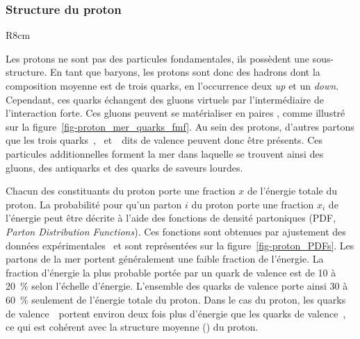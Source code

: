\subsubsection{Structure du proton}
\begin{wrapfigure}{R}{8cm}
\centering

\vspace{\baselineskip}
\caption{Diagramme de Feynman de la propagation d'un proton avec apparition d'une paire \quark\antiquark.}
\label{fig-proton_mer_quarks_fmf}
\end{wrapfigure}
Les protons ne sont pas des particules fondamentales, ils possèdent une sous-structure.
En tant que baryons, les protons sont donc des hadrons dont la composition moyenne est de trois quarks, en l'occurrence deux \emph{up} et un \emph{down}.
Cependant, ces quarks échangent des gluons virtuels par l'intermédiaire de l'interaction forte.
Ces gluons peuvent se matérialiser en paires \quark\antiquark, comme illustré sur la figure~\ref{fig-proton_mer_quarks_fmf}.
Au sein des protons, d'autres partons que les trois quarks~\quarku, \quarku\ et~\quarkd\ dits \og de valence \fg{} peuvent donc être présents.
Ces particules additionnelles forment la \og mer \fg{} dans laquelle se trouvent ainsi des gluons, des antiquarks et des quarks de saveurs lourdes.
\par Chacun des constituants du proton porte une fraction $x$ de l'énergie totale du proton.
La probabilité pour qu'un parton $i$ du proton porte une fraction $x_i$ de l'énergie peut être décrite à l'aide des fonctions de densité partoniques (PDF, \emph{Parton Distribution Functions}).
Ces fonctions sont obtenues par ajustement des données expérimentales~\cite{Gao_2018,Ball_2015} et sont représentées sur la figure~\ref{fig-proton_PDFs}.
Les partons de la mer portent généralement une faible fraction de l'énergie.
La fraction d'énergie la plus probable portée par un quark de valence est de \num{10} à \SI{20}{\%} selon l'échelle d'énergie.
L'ensemble des quarks de valence porte ainsi \num{30} à \SI{60}{\%} seulement de l'énergie totale du proton.
Dans le cas du proton, les quarks de valence~\quarku\ portent environ deux fois plus d'énergie que les quarks de valence~\quarkd, ce qui est cohérent avec la structure moyenne (\quarku\quarku\quarkd) du proton.
